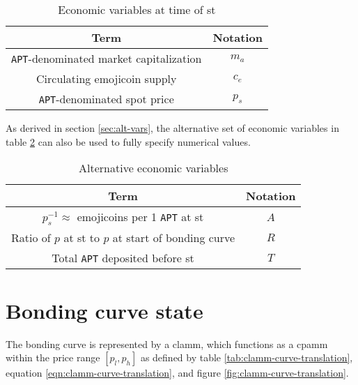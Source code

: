 \documentclass[table, twocolumn]{article}
\begin{document}
\begin{table}[!htb]
  \centering
  \begin{tabular}{|c|c|}
    \hline \rowcolor{blue}
    Term                                           & Notation \\ \hline
    \texttt{APT}-denominated market capitalization & $m_a$    \\ \hline
    Circulating emojicoin supply                   & $c_e$    \\ \hline
    \texttt{APT}-denominated spot price            & $p_s$    \\ \hline
  \end{tabular}
  \caption{Economic variables at time of \gls*{st}}
  \label{tab:state-model-variables}
\end{table}

As derived in section \ref{sec:alt-vars}, the alternative set of economic variables
in table \ref{tab:state-model-variables-alt} can also be used to fully specify numerical
values.

\begin{table}[!htb]
  \centering
  \begin{tabular}{|c|c|}
    \hline \rowcolor{blue}
    Term                                                          & Notation \\ \hline
    $p_s^{-1} \approx$ emojicoins per 1 \texttt{APT} at \gls*{st} & $A$      \\ \hline
    Ratio of $p$ at \gls*{st} to $p$ at start of bonding curve    & $R$      \\ \hline
    Total \texttt{APT} deposited before \gls*{st}                 & $T$      \\ \hline
  \end{tabular}
  \caption{Alternative economic variables}
  \label{tab:state-model-variables-alt}
\end{table}

\section{Bonding curve state} \label{sec:bonding-curve}

The bonding curve is represented by a \gls*{clamm}, which functions as a \gls*{cpamm}
within the price range $[p_l, p_h]$ as defined by table
\ref{tab:clamm-curve-translation}, equation \ref{eqn:clamm-curve-translation}, and
figure \ref{fig:clamm-curve-translation}.
\end{document}

